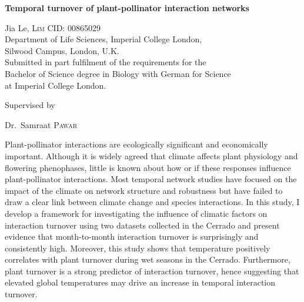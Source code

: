 \documentclass[11pt]{article}
\renewenvironment{abstract}
 {\hspace{.8cm}
  {\bfseries\huge\abstractname}
  \list{}{
    \setlength{\leftmargin}{.95cm}%
    \setlength{\rightmargin}{\leftmargin}%
  }%
  \item\relax}
 {\endlist}
\begin{document}
\begin{titlepage}
	\centering
	\vspace*{\fill}
	{\huge\bfseries Temporal turnover of plant-pollinator interaction networks \par}
	\vspace{2cm}
	{\Large Jia Le, \textsc{Lim} {    }  CID: 00865029}
	\\ 	\vspace{1cm}
	{Department of Life Sciences, Imperial College London, \\Silwood Campus, London, U.K.} \\ \vspace{1cm}
	{Submitted in part fulfilment of the requirements for the \\ Bachelor of Science degree in Biology with German for Science \\ at Imperial College London.} \\
	\vspace*{\fill}
	{\large Supervised by\par
	Dr.~Samraat \textsc{Pawar}}
	\vfill
	{\large}
\end{titlepage}

\newpage
{}
\vspace*{\fill}
\begin{abstract}  %
\vspace{1.5cm}
\doublespacing
Plant-pollinator interactions are ecologically significant and economically important. Although it is widely agreed that climate affects plant physiology and flowering phenophases, little is known about how or if these responses influence plant-pollinator interactions. Most temporal network studies have focused on the impact of the climate on network structure and robustness but have failed to draw a clear link between climate change and species interactions. In this study, I develop a framework for investigating the influence of climatic factors on interaction turnover using two datasets collected in the Cerrado and present evidence that month-to-month interaction turnover is surprisingly and consistently high. Moreover, this study shows that temperature positively correlates with plant turnover during wet seasons in the Cerrado. Furthermore, plant turnover is a strong predictor of interaction turnover, hence suggesting that elevated global temperatures may drive an increase in temporal interaction turnover. 
\end{abstract}
\vfill
\end{document}
